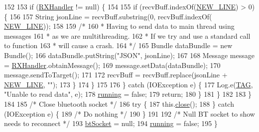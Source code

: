 \begin{DoxyCode}
152 
153                     \textcolor{keywordflow}{if} (\hyperlink{class_android_app_1_1_b_t_connection_a4e3bfea96a4ddbd2cd2b76bb4ce8b871}{RXHandler} != null) \{
154 
155                         \textcolor{keywordflow}{if} (recvBuff.indexOf(\hyperlink{class_android_app_1_1_b_t_connection_afe2f59edec0610e765222e02ab350e84}{NEW\_LINE}) > 0) \{
156 
157                             String jsonLine = recvBuff.substring(0, recvBuff.indexOf(
      \hyperlink{class_android_app_1_1_b_t_connection_afe2f59edec0610e765222e02ab350e84}{NEW\_LINE}));
158 
159                             \textcolor{comment}{/*}
160 \textcolor{comment}{                             * Having to send data to main thread using messages}
161 \textcolor{comment}{                             * as we are multithreading.}
162 \textcolor{comment}{                             * If we try and use a standard call to function}
163 \textcolor{comment}{                             * will cause a crash.}
164 \textcolor{comment}{                             */}
165                             Bundle dataBundle =  \textcolor{keyword}{new} Bundle();
166                             dataBundle.putString(\textcolor{stringliteral}{"JSON"}, jsonLine);
167 
168                             Message message = \hyperlink{class_android_app_1_1_b_t_connection_a4e3bfea96a4ddbd2cd2b76bb4ce8b871}{RXHandler}.obtainMessage();
169                             message.setData(dataBundle);
170                             message.sendToTarget();
171 
172                             recvBuff = recvBuff.replace(jsonLine + \hyperlink{class_android_app_1_1_b_t_connection_afe2f59edec0610e765222e02ab350e84}{NEW\_LINE}, \textcolor{stringliteral}{""});
173                         \}
174                     \}
175 
176                 \} \textcolor{keywordflow}{catch} (IOException e) \{
177                     Log.e(\hyperlink{class_android_app_1_1_b_t_connection_ad838024d59c68be866b5db329d6f6230}{TAG}, \textcolor{stringliteral}{"Unable to read data"}, e);
178                     \hyperlink{class_android_app_1_1_b_t_connection_ace01a7a97f5d1abccb61a5d6c6ad9295}{running} = \textcolor{keyword}{false};
179                     \textcolor{keywordflow}{return};
180                 \}
181             \}
182 
183         \}
184 
185         \textcolor{comment}{/* Close bluetooth socket */}
186         \textcolor{keywordflow}{try} \{
187             this.\hyperlink{class_android_app_1_1_b_t_connection_a37bb3e5c1dcf6b78a73239f6f62ab6d8}{close}();
188         \} \textcolor{keywordflow}{catch} (IOException e) \{
189             \textcolor{comment}{/* Do nothing */}
190         \}
191 
192         \textcolor{comment}{/* Null BT socket to show needs to reconnect */}
193         \hyperlink{class_android_app_1_1_b_t_connection_af3cdc6c880b28361d87d0118ace0e49c}{btSocket} = null;
194         \hyperlink{class_android_app_1_1_b_t_connection_ace01a7a97f5d1abccb61a5d6c6ad9295}{running} = \textcolor{keyword}{false};
195     \}
\end{DoxyCode}
